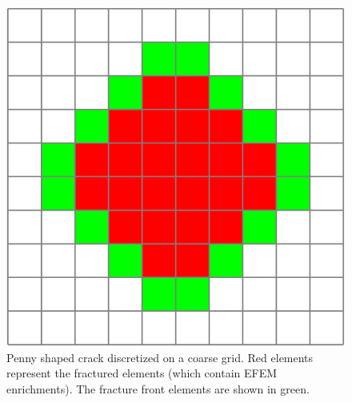 \begin{figure}[h]
    \centering
    \includegraphics[width=0.4\linewidth]{Chapter4/figures/front_penny.png}
    \caption{Penny shaped crack discretized on a coarse grid. Red elements represent the fractured elements (which contain EFEM enrichments). The fracture front elements are shown in green. }
    \label{fig:crack_front}
\end{figure}

